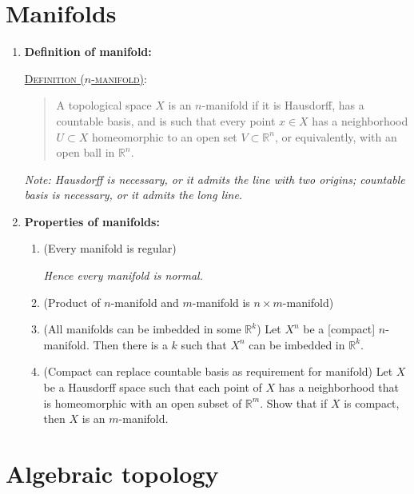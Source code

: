 \documentclass[letterpaper, 12pt]{article}
\newcommand{\RR}{\mathbb{R}}
\newcommand{\defn}[2]{\textsc{\underline{Definition (#1)}:}\begin{quote} #2\end{quote}}
\begin{document}
\section{Manifolds}
    \begin{enumerate}[resume]
    \item \textbf{Definition of manifold:}

        \defn{$n$-manifold}{A topological space $X$ is an $n$-manifold if it is Hausdorff, has a countable basis, and is such that every point $x\in X$ has a neighborhood $U\subset X$ homeomorphic to an open set $V\subset\RR^n$, or equivalently, with an open ball in $\RR^n$.}

        \textit{Note: Hausdorff is necessary, or it admits the line with two origins; countable basis is necessary, or it admits the long line.}
    \item \textbf{Properties of manifolds:}
        \begin{enumerate}
        \item (Every manifold is regular)

            \textit{Hence every manifold is normal.}
        \item (Product of $n$-manifold and $m$-manifold is $n\times m$-manifold)
        \item (All manifolds can be imbedded in some $\RR^k$) Let $X^n$ be a [compact] $n$-manifold. Then there is a $k$ such that $X^n$ can be imbedded in $\RR^k$. %
        \item (Compact can replace countable basis as requirement for manifold) Let $X$ be a Hausdorff space such that each point of $X$ has a neighborhood that is homeomorphic with an open subset of $\RR^m$. Show that if $X$ is compact, then $X$ is an $m$-manifold.
        \end{enumerate}
    \end{enumerate}

\section{Algebraic topology}
\end{document}

